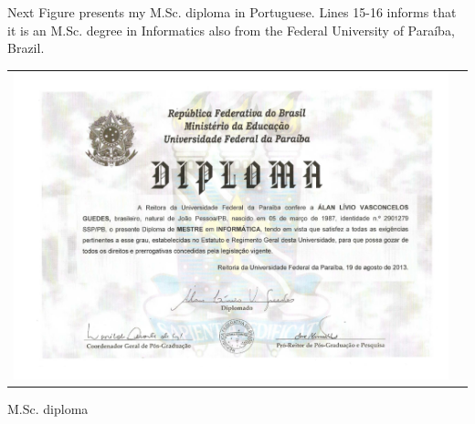 \documentclass[10pt,a4paper,sans,colorlinks]{moderncv}
\begin{document}
Next Figure presents my M.Sc. diploma in Portuguese.
Lines 15-16 informs that it is an M.Sc. degree in Informatics also from the Federal University of Paraíba, Brazil.

\begin{Figure}
  \begin{tabularx}{\textwidth}{X p{1cm}}
    \includegraphics[align=t,width=\textwidth, keepaspectratio]{certificates/msc-diploma.pdf}
  \end{tabularx}
  \caption{M.Sc. diploma}
\end{Figure}


\newpage
\end{document}
